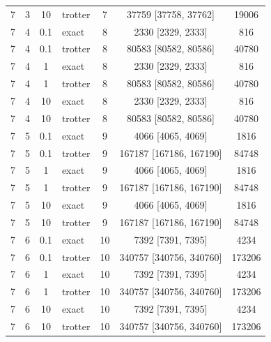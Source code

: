 \begin{tabular}{ccclccc}
7 & 3 & 10 & trotter & 7 & 37759 [37758, 37762] & 19006 \\
7 & 4 & 0.1 & exact & 8 & 2330 [2329, 2333] & 816 \\
7 & 4 & 0.1 & trotter & 8 & 80583 [80582, 80586] & 40780 \\
7 & 4 & 1 & exact & 8 & 2330 [2329, 2333] & 816 \\
7 & 4 & 1 & trotter & 8 & 80583 [80582, 80586] & 40780 \\
7 & 4 & 10 & exact & 8 & 2330 [2329, 2333] & 816 \\
7 & 4 & 10 & trotter & 8 & 80583 [80582, 80586] & 40780 \\
7 & 5 & 0.1 & exact & 9 & 4066 [4065, 4069] & 1816 \\
7 & 5 & 0.1 & trotter & 9 & 167187 [167186, 167190] & 84748 \\
7 & 5 & 1 & exact & 9 & 4066 [4065, 4069] & 1816 \\
7 & 5 & 1 & trotter & 9 & 167187 [167186, 167190] & 84748 \\
7 & 5 & 10 & exact & 9 & 4066 [4065, 4069] & 1816 \\
7 & 5 & 10 & trotter & 9 & 167187 [167186, 167190] & 84748 \\
7 & 6 & 0.1 & exact & 10 & 7392 [7391, 7395] & 4234 \\
7 & 6 & 0.1 & trotter & 10 & 340757 [340756, 340760] & 173206 \\
7 & 6 & 1 & exact & 10 & 7392 [7391, 7395] & 4234 \\
7 & 6 & 1 & trotter & 10 & 340757 [340756, 340760] & 173206 \\
7 & 6 & 10 & exact & 10 & 7392 [7391, 7395] & 4234 \\
7 & 6 & 10 & trotter & 10 & 340757 [340756, 340760] & 173206 \\
\hline
\end{tabular}

